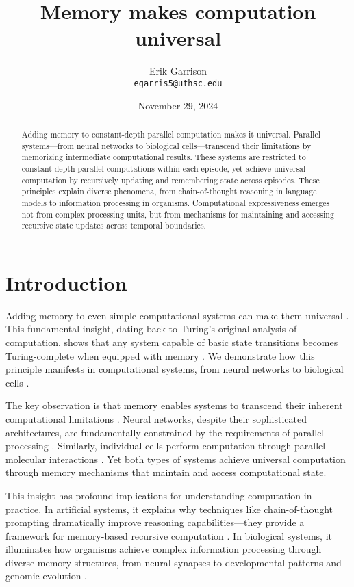 \documentclass[12pt]{article}
\title{Memory makes computation universal}
\author{Erik Garrison\\
  \texttt{egarris5@uthsc.edu}\\[1ex]
  }
\date{November 29, 2024}
\begin{document}
\maketitle

\begin{abstract}
Adding memory to constant-depth parallel computation makes it universal.
Parallel systems---from neural networks to biological cells---transcend their limitations by memorizing intermediate computational results.
These systems are restricted to constant-depth parallel computations within each episode, yet achieve universal computation by recursively updating and remembering state across episodes.
These principles explain diverse phenomena, from chain-of-thought reasoning in language models to information processing in organisms.
Computational expressiveness emerges not from complex processing units, but from mechanisms for maintaining and accessing recursive state updates across temporal boundaries.
\end{abstract}

\section{Introduction}
Adding memory to even simple computational systems can make them universal \cite{merrill2023parallelism,peng2024limitations}. This fundamental insight, dating back to Turing's original analysis of computation, shows that any system capable of basic state transitions becomes Turing-complete when equipped with memory \cite{swamy1983space,bisaz2024memory}. We demonstrate how this principle manifests in computational systems, from neural networks to biological cells \cite{wang2023parallel}.

The key observation is that memory enables systems to transcend their inherent computational limitations \cite{barrett2019analyzing,ganguli2018intertwined}. Neural networks, despite their sophisticated architectures, are fundamentally constrained by the requirements of parallel processing \cite{cai2024efficient}. Similarly, individual cells perform computation through parallel molecular interactions \cite{fu2023scgrn,hoel2020emergence}. Yet both types of systems achieve universal computation through memory mechanisms that maintain and access computational state.

This insight has profound implications for understanding computation in practice. In artificial systems, it explains why techniques like chain-of-thought prompting dramatically improve reasoning capabilities---they provide a framework for memory-based recursive computation \cite{wei2022chain,ahn2024recursive}. In biological systems, it illuminates how organisms achieve complex information processing through diverse memory structures, from neural synapses to developmental patterns and genomic evolution \cite{burrill2010making,espinosa2024molecular}.
\end{document}
